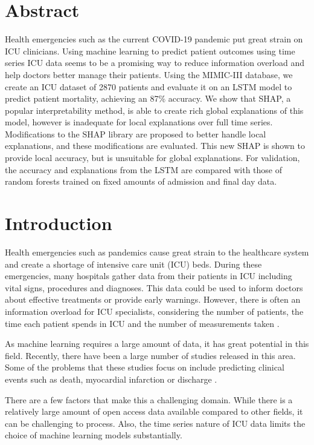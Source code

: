 \documentclass[12pt]{article}
\begin{document}
\newpage
\section*{Abstract}

Health emergencies such as the current COVID-19 pandemic put great strain on ICU clinicians. Using machine learning to predict patient outcomes using time series ICU data seems to be a promising way to reduce information overload and help doctors better manage their patients. Using the MIMIC-III database, we create an ICU dataset of 2870 patients and evaluate it on an LSTM model to predict patient mortality, achieving an 87\% accuracy. We show that SHAP, a popular interpretability method, is able to create rich global explanations of this model, however is inadequate for local explanations over full time series. Modifications to the SHAP library are proposed to better handle local explanations, and these modifications are evaluated. This new SHAP is shown to provide local accuracy, but is unsuitable for global explanations. For validation, the accuracy and explanations from the LSTM are compared with those of random forests trained on fixed amounts of admission and final day data.

\newpage
\tableofcontents
\newpage
\section{Introduction}
Health emergencies such as pandemics cause great strain to the healthcare system and create a shortage of intensive care unit (ICU) beds. During these emergencies, many hospitals gather data from their patients in ICU including vital signs, procedures and diagnoses. This data could be used to inform doctors about effective treatments or provide early warnings. However, there is often an information overload for ICU specialists, considering the number of patients, the time each patient spends in ICU and the number of measurements taken \cite{KajiLSTM}.

As machine learning requires a large amount of data, it has great potential in this field. Recently, there have been a large number of studies released in this area. Some of the problems that these studies focus on include predicting clinical events such as death, myocardial infarction or discharge \cite{KajiLSTM}. 

There are a few factors that make this a challenging domain. While there is a relatively large amount of open access data available compared to other fields, it can be challenging to process. Also, the time series nature of ICU data limits the choice of machine learning models substantially. 
\end{document}
